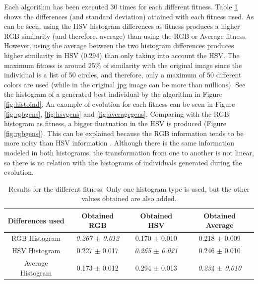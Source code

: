\documentclass[conference]{IEEEtran}
\begin{document}
Each algorithm has been executed 30 times for each different fitness. Table \ref{tab:results} shows the differences (and standard deviation) attained with each fitness used. As can be seen, using the HSV histogram differences as fitness produces a higher RGB similarity (and therefore, average) than using the RGB or Average fitness. However, using the average between the two histogram differences produces higher similarity in HSV (0.294) than only taking into account the HSV. The maximum fitness is around 25\% of similarity with the original image since the individual is a list of 50 circles, and therefore, only a maximum of 50 different colors are used (while in the original jpg image can be more than millions). See the histogram of a generated best individual by the algorithm in Figure \ref{fig:histoind}. An example of evolution for each fitness can be seen in Figure \ref{fig:rgbgens}, \ref{fig:hsvgens} and \ref{fig:averagegens}. Comparing with the RGB histogram as fitness, a bigger fluctuation in the HSV is produced (Figure \ref{fig:rgbgens}). This can be explained because the RGB information tends to be more noisy than HSV information \cite{COLORDIFFERENCES}. Although there is the same information modeled in both histograms, the transformation from one to another is not linear, so there is no relation with the histograms of individuals generated during the evolution.

\begin{table}
\centering
\caption{Results for the different fitness. Only one histogram type is used, but the other values obtained are also added.}
\begin{tabular}{|c|c|c|c|} \hline
Differences used & Obtained RGB      		& Obtained HSV  & Obtained Average \\ \hline
RGB Histogram    & {\em 0.267 $\pm$ 0.012}	& 0.170 $\pm$ 0.010 	& 0.218 $\pm$ 0.009	\\ \hline
HSV Histogram    & 0.227 $\pm$ 0.017	& {\em 0.265 $\pm$ 0.021}	& 0.246 $\pm$ 0.010 \\ \hline
Average Histogram& 0.173 $\pm$ 0.012	& 0.294 $\pm$ 0.013	& {\em 0.234 $\pm$ 0.010} \\ \hline
\end{tabular}
\label{tab:results}
\end{table}
\end{document}
